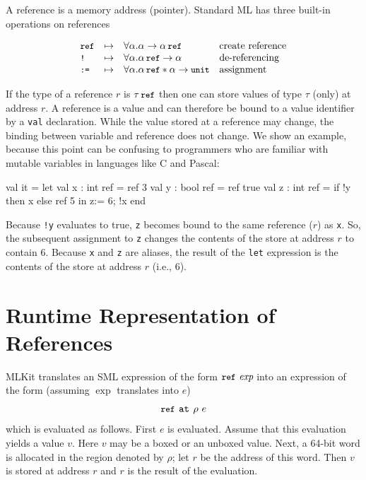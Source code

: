 \documentclass[12pt]{book}
\begin{document}
A reference is a memory address (pointer).  Standard ML has three
built-in operations on
%
%
references
%
%
%
%
\medskip

\[
\begin{array}{lcll}
\mbox{\small\ttfamily ref} & \mapsto & \forall\alpha.\alpha\to\alpha\,\mbox{\small\ttfamily ref} & \mbox{create reference} \\
\mbox{\small\ttfamily!}   & \mapsto & \forall\alpha.\alpha\,\mbox{\small\ttfamily ref}\to\alpha & \mbox{de-referencing} \\
\mbox{\small\ttfamily:=}  & \mapsto & \forall\alpha.\alpha\,\mbox{\small\ttfamily ref}\ast\alpha\to\mbox{\small\ttfamily unit} & \mbox{assignment}
\end{array}
\]
\medskip

\noindent
If the type of a reference $r$ is $\tau\,\mbox{\small\ttfamily ref}$ then one can store values of type
$\tau$ (only) at address $r$.  A reference is a value and can therefore be bound
to a value identifier by a \lstinline{val} declaration. While the value stored
at a reference may change, the binding between variable and reference does not
change. We show an example, because this point can be confusing to programmers
who are familiar with mutable variables in languages like C and Pascal:
\begin{smlcode}
  val it =
    let val x : int ref = ref 3
        val y : bool ref = ref true
        val z : int ref = if !y then x else ref 5
    in z:= 6; !x
    end
\end{smlcode}
Because \lstinline{!y} evaluates to true, \lstinline{z} becomes bound to the
same reference ($r$) as \lstinline{x}.  So, the subsequent assignment to
\lstinline{z} changes the contents of the store at address $r$ to contain 6.
Because \lstinline{x} and \lstinline{z} are aliases, the result of the
\lstinline{let} expression is the contents of the store at address $r$ (i.e.,
6).

\section{Runtime Representation of References}
MLKit translates an SML expression of the form $\mbox{\small\ttfamily ref}~\hbox{\it exp}$ into an
expression of the form (assuming $\exp$ translates into $e$)
$$\mbox{\small\ttfamily ref}\,\mathbin{\hbox{\tt at}}\,\rho~ e$$ which is evaluated as follows. First $e$ is
evaluated. Assume that this evaluation yields a value $v$. Here $v$ may be a
%
%
%
boxed or an unboxed value.  Next, a 64-bit word is allocated in the region
denoted by $\rho$; let $r$ be the address of this word. Then $v$ is stored at
address $r$ and $r$ is the result of the evaluation.
\end{document}
